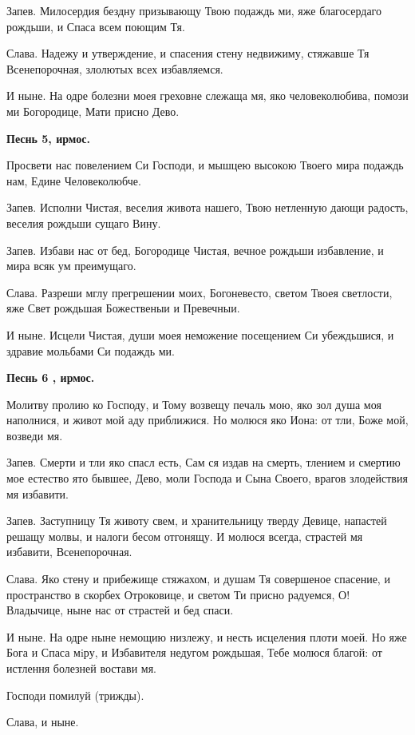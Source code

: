 Запев. Милосердия бездну призывающу Твою подаждь ми, яже благосердаго рождьши, и Спаса всем поющим Тя.

Слава. Надежу и утверждение, и спасения стену недвижиму, стяжавше Тя Всенепорочная, злолютых всех избавляемся.

И ныне. На одре болезни моея греховне слежаща мя, яко человеколюбива, помози ми Богородице, Мати присно Дево.


\medskip


\bfseries Песнь 5, ирмос.\normalfont{}\nopagebreak


Просвети нас повелением Си Господи, и мышцею высокою Твоего мира подаждь нам, Едине Человеколюбче.

Запев. Исполни Чистая, веселия живота нашего, Твою нетленную дающи радость, веселия рождьши сущаго Вину.

Запев. Избави нас от бед, Богородице Чистая, вечное рождьши избавление, и мира всяк ум преимущаго.

Слава. Разреши мглу прегрешении моих, Богоневесто, светом Твоея светлости, яже Свет рождьшая Божественыи и Превечныи.

И ныне. Исцели Чистая, души моея неможение посещением Си убеждьшися, и здравие мольбами Си подаждь ми.


\medskip


\bfseries Песнь 6 , ирмос.\normalfont{}\nopagebreak


Молитву пролию ко Господу, и Тому возвещу печаль мою, яко зол душа моя наполнися, и живот мой аду приближися. Но молюся яко Иона: от тли, Боже мой, возведи мя.

Запев. Смерти и тли яко спасл есть, Сам ся издав на смерть, тлением и смертию мое естество ято бывшее, Дево, моли Господа и Сына Своего, врагов злодействия мя избавити.

Запев. Заступницу Тя животу свем, и хранительницу тверду Девице, напастей решащу молвы, и налоги бесом отгонящу. И молюся всегда, страстей мя избавити, Всенепорочная.

Слава. Яко стену и прибежище стяжахом, и душам Тя совершеное спасение, и пространство в скорбех Отроковице, и светом Ти присно радуемся, О! Владычице, ныне нас от страстей и бед спаси.

И ныне. На одре ныне немощию низлежу, и несть исцеления плоти моей. Но яже Бога и Спаса мiру, и Избавителя недугом рождьшая, Тебе молюся благой: от истлення болезней востави мя.

Господи помилуй (трижды). 

Слава, и ныне.


